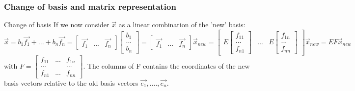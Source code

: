 \begin{frame}
	\frametitle{Change of basis and matrix representation}
	\begin{block}{Change of basis}
		If we now consider $\overrightarrow{x}$ as a linear combination of the 'new' basis: $\overrightarrow{x}=b_1\overrightarrow{f_1}+...+b_n\overrightarrow{f_n}=\begin{bmatrix} \overrightarrow{f_1} & ... & \overrightarrow{f_n} \end{bmatrix} \begin{bmatrix} b_1 \\ ...\\ b_n \end{bmatrix}=\begin{bmatrix} \overrightarrow{f_1} & ... & \overrightarrow{f_n} \end{bmatrix}\overrightarrow{x}_{new}= \begin{bmatrix} E\begin{bmatrix} f_{11} \\ ... \\ f_{n1} \end{bmatrix} & ... & E\begin{bmatrix} f_{1n} \\ ... \\ f_{nn} \end{bmatrix} \end{bmatrix}\overrightarrow{x}_{new}= EF\overrightarrow{x}_{new}$ with $F=\begin{bmatrix} 
		f_{11} & ... & f_{1n}\\
		... & & ...\\
		f_{n1} & ... & f_{nn} \end{bmatrix}$. The columns of F contains the coordinates of the new basis vectors relative to the old basis vectors $\overrightarrow{e_1},....,\overrightarrow{e_n}$. 
	\end{block}
\end{frame}

